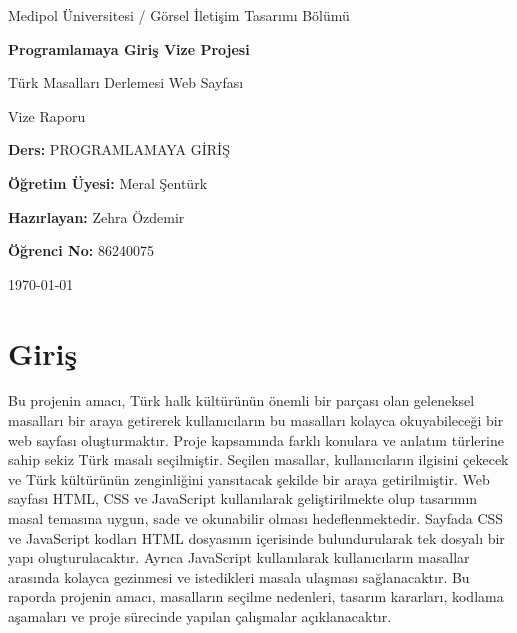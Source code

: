 \documentclass[12pt,a4paper]{article}
\newcommand{\universite}{Medipol Üniversitesi /
                         Görsel İletişim Tasarımı Bölümü}
\newcommand{\dersadi}{PROGRAMLAMAYA GİRİŞ}
\newcommand{\hocaadi}{Meral Şentürk}
\newcommand{\ogrenciadi}{Zehra Özdemir}
\newcommand{\ogrencino}{86240075}
\newcommand{\projeadi}{Programlamaya Giriş Vize Projesi}
\begin{document}
\begin{titlepage}
\centering
\vspace*{1cm}
{\large \universite \par}
\vspace{1.8cm}
{\Huge\bfseries\color{ana} \projeadi \par}
\vspace{0.4cm}
{\Large Türk Masalları Derlemesi Web Sayfası \par}
{\large Vize Raporu \par}
\vspace{1.8cm}
{\large \textbf{Ders:} \dersadi \par}
{\large \textbf{Öğretim Üyesi:} \hocaadi \par}
\vspace{1.2cm}
{\large \textbf{Hazırlayan:} \ogrenciadi \par}
{\large \textbf{Öğrenci No:} \ogrencino \par}
\vspace{1.8cm}
\vfill
{\large \today \par}
\end{titlepage}

\tableofcontents
\newpage

\section{Giriş}
 Bu projenin amacı, Türk halk kültürünün önemli bir parçası olan
geleneksel masalları bir araya getirerek kullanıcıların bu masalları
kolayca okuyabileceği bir web sayfası oluşturmaktır. Proje kapsamında
farklı konulara ve anlatım türlerine sahip sekiz Türk masalı seçilmiştir.
Seçilen masallar, kullanıcıların ilgisini çekecek ve Türk kültürünün
zenginliğini yansıtacak şekilde bir araya getirilmiştir. Web sayfası
HTML, CSS ve JavaScript kullanılarak geliştirilmekte olup tasarımın
masal temasına uygun, sade ve okunabilir olması hedeflenmektedir.
Sayfada CSS ve JavaScript kodları HTML dosyasının içerisinde
bulundurularak tek dosyalı bir yapı oluşturulacaktır. Ayrıca
JavaScript kullanılarak kullanıcıların masallar arasında kolayca
gezinmesi ve istedikleri masala ulaşması sağlanacaktır. Bu raporda
projenin amacı, masalların seçilme nedenleri, tasarım kararları,
kodlama aşamaları ve proje sürecinde yapılan çalışmalar açıklanacaktır.
\end{document}
